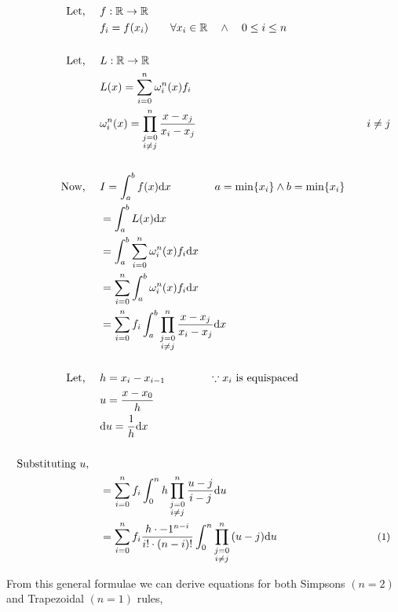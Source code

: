 \documentclass[12pt]{article}
\begin{document}
\begin{align*}
	\text{Let, } \quad &f : \mathbb{R} \rightarrow \mathbb{R}\\
			   &f_i = f(x_i) \qquad \forall x_i \in \mathbb{R} \quad \wedge \quad 0 \le i \le n\\\\
	\text{Let, } \quad &L : \mathbb{R} \rightarrow \mathbb{R}\\
		    &L(x) = \sum_{i=0}^n \omega^n_i(x) f_i\\
	&\omega^n_i(x) = \prod \limits_{\substack{j=0 \\ i \not = j}}^n \frac{x - x_j}{x_i - x_j}& \quad i \not = j\\\\
	\text{Now, } \quad &I = \int_{a}^{b} f(x) \mathrm{d}x \qquad \qquad a = \min\{x_i\} \wedge b = \min\{x_i\}\\
				    &= \int_{a}^{b} L(x) \mathrm{d}x\\
				    &= \int_{a}^{b} \sum_{i=0}^n \omega^n_i(x) f_i \mathrm{d}x\\
				    &= \sum_{i=0}^n \int_{a}^{b} \omega^n_i(x) f_i \mathrm{d}x\\
				    &= \sum_{i=0}^n f_i \int_{a}^{b} \prod \limits_{\substack{j=0 \\ i \not = j}}^n \frac{x - x_j}{x_i - x_j} \mathrm{d}x\\\\
	\text{Let, } \quad &h = x_i - x_{i - 1} \qquad \qquad \because x_i\text{ is equispaced}\\
			   &u = \frac{x - x_0}{h}\\
			   &\mathrm{d}u = \frac{1}{h} \mathrm{d}x\\\\
	\text{Substituting }u, \quad &\\
				   &= \sum_{i=0}^n f_i \int_{0}^{n} h \prod \limits_{\substack{j=0 \\ i \not = j}}^n \frac{u - j}{i - j} \mathrm{d}u\\
				   &= \sum_{i=0}^n f_i \frac{h \cdot -1^{n-i}}{i! \cdot (n-i)!} \int_{0}^{n} \prod \limits_{\substack{j=0 \\ i \not = j}}^n {(u - j)} \mathrm{d}u  &\text{\small{(1)}}
\end{align*}

\break
From this general formulae we can derive equations for both Simpsons $(n=2)$ and Trapezoidal $(n=1)$ rules,
\end{document}

